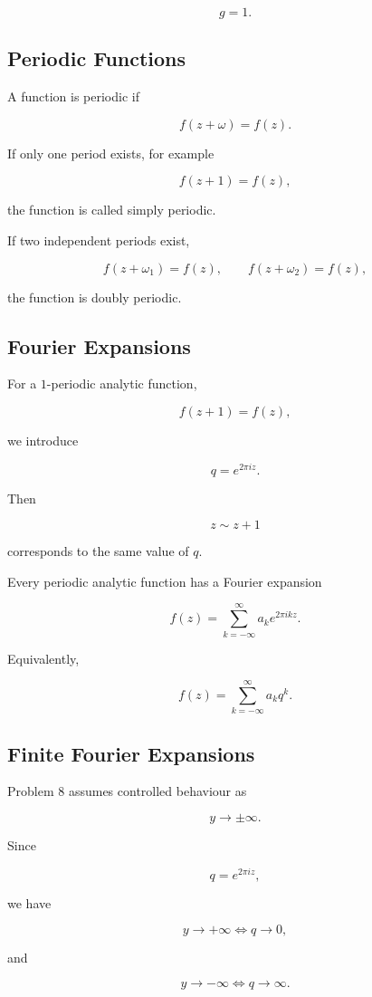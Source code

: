\documentclass[12pt,a4paper]{article}
\theoremstyle{notespace}
\begin{document}
\[
g=1.
\]

\subsection{Periodic Functions}

A function is periodic if

\[
f(z+\omega)=f(z).
\]

If only one period exists, for example

\[
f(z+1)=f(z),
\]

the function is called simply periodic.

If two independent periods exist,

\[
f(z+\omega_1)=f(z),
\qquad
f(z+\omega_2)=f(z),
\]

the function is doubly periodic.

\subsection{Fourier Expansions}

For a \(1\)-periodic analytic function,

\[
f(z+1)=f(z),
\]

we introduce

\[
q=e^{2\pi iz}.
\]

Then

\[
z\sim z+1
\]

corresponds to the same value of \(q\).

Every periodic analytic function has a Fourier expansion

\[
f(z)
=
\sum_{k=-\infty}^{\infty}
a_k e^{2\pi ikz}.
\]

Equivalently,

\[
f(z)
=
\sum_{k=-\infty}^{\infty}
a_k q^k.
\]

\subsection{Finite Fourier Expansions}

Problem 8 assumes controlled behaviour as

\[
y\to\pm\infty.
\]

Since

\[
q=e^{2\pi iz},
\]

we have

\[
y\to+\infty
\Longleftrightarrow
q\to0,
\]

and

\[
y\to-\infty
\Longleftrightarrow
q\to\infty.
\]
\end{document}
